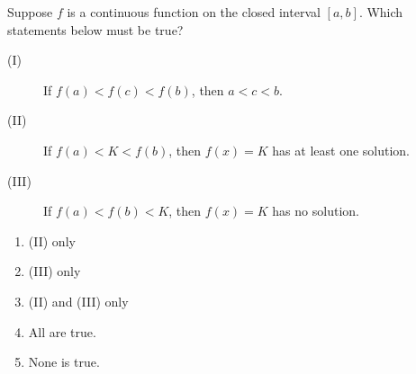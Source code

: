 \item Suppose $f$ is a continuous function on the closed interval $[a,b]$. Which statements below must be true?
	
	\begin{description}
		\item[(I)] If $f(a) < f(c) <f(b)$, then $a<c<b$. 
		\item[(II)] If $f(a) < K < f(b)$, then $f(x) = K$ has at least one solution. 
		\item[(III)] If $f(a) < f(b) < K$, then $f(x) = K$ has no solution.  
	\end{description}

\begin{multicols}{2}
	\begin{enumerate} \setlength{\itemsep}{.25cm}
		\item 	(II) only 
		\item  	(III) only
		\item 	(II) and (III) only
		\item   All are true. %
		\item   None is true. 	%
	\end{enumerate}
\end{multicols}